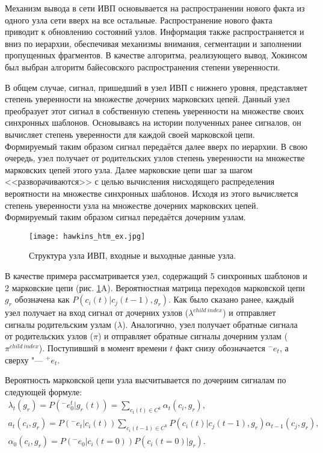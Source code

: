 Механизм вывода в сети ИВП основывается на распространении нового факта из одного узла сети вверх на все остальные. Распространение нового факта приводит к обновлению состояний узлов. Информация также распространяется и вниз по иерархии, обеспечивая механизмы внимания, сегментации и заполнении пропущенных фрагментов. В качестве алгоритма, реализующего вывод, Хокинсом был выбран алгоритм байесовского распространения степени уверенности.

В общем случае, сигнал, пришедший в узел ИВП с нижнего уровня, представляет степень уверенности на множестве дочерних марковских цепей. Данный узел преобразует этот сигнал в собственную степень уверенности на множестве своих синхронных шаблонов. Основываясь на истории полученных ранее сигналов, он вычисляет степень уверенности для каждой своей марковской цепи. Формируемый таким образом сигнал передаётся далее вверх по иерархии. В свою очередь, узел получает от родительских узлов степень уверенности на множестве марковских цепей этого узла. Далее марковские цепи шаг за шагом <<разворачиваются>> с целью вычисления нисходящего распределения вероятности на множестве синхронных шаблонов. Исходя из этого вычисляется степень уверенности узла на множестве дочерних марковских цепей. Формируемый таким образом сигнал передаётся дочерним узлам.

\begin{figure}[h]
	\centering
	\texttt{[image: hawkins\_htm\_ex.jpg]}
	\caption{Структура узла ИВП, входные и выходные данные узла.}
	\label{fg:hawkins_htm_ex}
\end{figure}

В качестве примера рассматривается узел, содержащий 5 синхронных шаблонов и 2 марковские цепи (рис. \ref{fg:hawkins_htm_ex}A). Вероятностная матрица переходов марковской цепи $g_r$ обозначена как $P(c_i(t)|c_j(t-1),g_r)$. Как было сказано ранее, каждый узел получает на вход сигнал от дочерних узлов ($\lambda^{child\ index}$) и отправляет сигналы родительским узлам ($\lambda$). Аналогично, узел получает обратные сигнала от родительских узлов ($\pi$) и отправляет обратные сигналы дочерним узлам ($\pi^{child\ index}$). Поступивший в момент времени $t$ факт снизу обозначается ${}^-e_t$, а сверху "--- ${}^+e_t$.

Вероятность марковской цепи узла высчитывается по дочерним сигналам по следующей формуле:
\[
	\begin{split}
	\lambda_t(g_r)=P({}^-e_0^t|g_r(t)) = \sum_{c_t(t)\in C^k}\alpha_t(c_i, g_r),\\
	a_t(c_i,g_r )=P({}^-e_t|c_i(t))\sum_{c_i(t-1)\in C^k}P(c_i(t)|c_j(t-1),g_r)\alpha_{t-1}(c_j,g_r),\\
	\alpha_0(c_i,g_r)=P({}^-e_0|c_i(t=0))P(c_i(t=0)|g_r).
	\end{split}
\]


